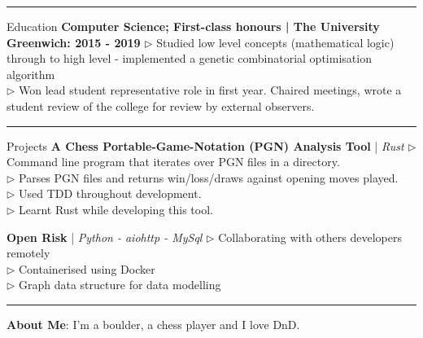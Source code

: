 \documentclass[12pt,twoside]{article}
\begin{document}
\vspace{0.8em}
\hrule
\vspace{0.8em}

\headedsection
    {Education}
    {
        \textbf{Computer Science; First-class honours | The University
        Greenwich: 2015 - 2019}
    }
    {
        $\triangleright$ Studied low level concepts (mathematical logic)
        through to high level - implemented a genetic combinatorial optimisation
        algorithm \\
        $\triangleright$ Won lead student representative role in first year.
        Chaired meetings, wrote a student review of the college for review by
        external observers.
    }

\vspace{0.7em}
\hrule
\vspace{0.7em}

\headedsection
    {Projects}
    {\textbf{A Chess Portable-Game-Notation (PGN) Analysis Tool} | \textit{Rust}}
    {
        $\triangleright$ Command line program that iterates over PGN files in a
        directory. \\
        $\triangleright$ Parses PGN files and returns win/loss/draws against
        opening moves played. \\
        $\triangleright$ Used TDD throughout development. \\
        $\triangleright$ Learnt Rust while developing this tool.
    }

\vspace{0.1em}

\headedsection
    {}
    {\textbf{Open Risk} | \textit{Python - aiohttp - MySql}}
    {
        $\triangleright$ Collaborating with others developers remotely \\
        $\triangleright$ Containerised using Docker \\
        $\triangleright$ Graph data structure for data modelling
    }

\vspace{0.7em}
\hrule
\vspace{0.7em}

\hspace{-2em}\textbf{About Me}: I'm a boulder, a chess player and I love DnD.
\end{document}
